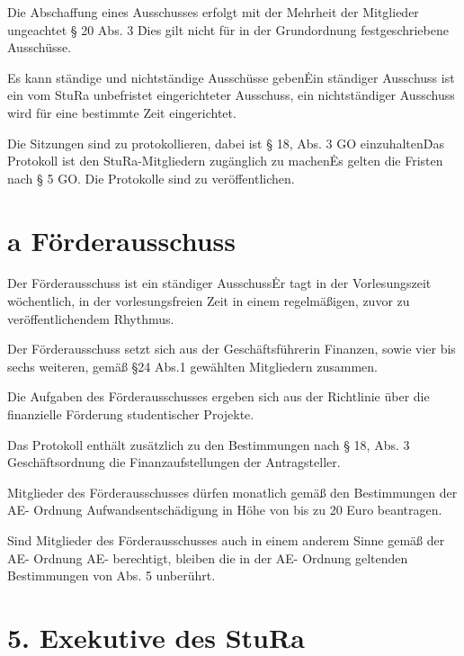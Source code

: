 \begin{multicols}{2}
\Abs \Satz Die Abschaffung eines Ausschusses erfolgt mit der Mehrheit der Mitglieder ungeachtet § 20 Abs. 3 \. Dies gilt nicht für in der Grundordnung festgeschriebene Ausschüsse.

\Abs \Satz Es kann ständige und nichtständige Ausschüsse geben\. Ein ständiger Ausschuss ist ein vom StuRa unbefristet eingerichteter Ausschuss, ein nichtständiger Ausschuss wird für eine bestimmte Zeit eingerichtet.

\Abs \Satz Die Sitzungen sind zu protokollieren, dabei ist § 18, Abs. 3 GO einzuhalten\. Das Protokoll ist den StuRa-Mitgliedern zugänglich zu machen\. Es gelten die Fristen nach § 5 GO. Die Protokolle sind zu veröffentlichen.



\setcounter{section}{23}
\section{a Förderausschuss}

\Abs \Satz Der Förderausschuss ist ein ständiger Ausschuss\. Er tagt in der Vorlesungszeit wöchentlich, in der vorlesungsfreien Zeit in einem regelmäßigen, zuvor zu veröffentlichendem Rhythmus.

\Abs \Satz Der Förderausschuss setzt sich aus der Geschäftsführerin Finanzen, sowie vier bis sechs weiteren, gemäß §24 Abs.1 gewählten Mitgliedern zusammen.

\Abs \Satz Die Aufgaben des Förderausschusses ergeben sich aus der Richtlinie über die finanzielle Förderung studentischer Projekte.

\Abs \Satz Das Protokoll enthält zusätzlich zu den Bestimmungen nach § 18, Abs. 3 Geschäftsordnung die Finanzaufstellungen der Antragsteller.

\Abs \Satz Mitglieder des Förderausschusses dürfen monatlich gemäß den Bestimmungen der AE- Ordnung Aufwandsentschädigung in Höhe von bis zu 20 Euro beantragen. 

\Abs \Satz Sind Mitglieder des Förderausschusses auch in einem anderem Sinne gemäß der AE- Ordnung AE- berechtigt, bleiben die in der AE- Ordnung geltenden Bestimmungen von Abs. 5 unberührt.


\setcounter{section}{24}

\section*{5. Exekutive des StuRa}




\end{multicols}
